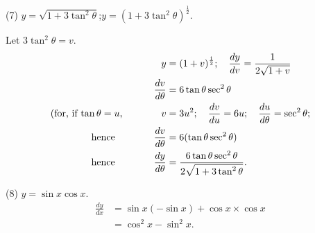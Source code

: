\documentclass[12pt]{book}%
\begin{document}
(7) $y = \sqrt{1+3\tan^{2}\theta}$;\quad$y=(1+3 \tan^{2} \theta)^{\frac{1}{2}%
}$.

Let $3\tan^{2}\theta=v$.
\begin{align*}
y  &  = (1+v)^{\frac{1}{2}};\quad\frac{dy}{dv} = \frac{1}{2\sqrt{1+v}}\\
\frac{dv}{d\theta}  &  = 6\tan\theta\sec^{2} \theta\\
\text{(for, if $\tan\theta= u$,\qquad\qquad} v  &  = 3u^{2};\quad\frac{dv}{du}
= 6u;\quad\frac{du}{d\theta} = \sec^{2} \theta;\\
\text{hence\qquad\qquad} \frac{dv}{d\theta}  &  = 6 (\tan\theta\sec^{2}
\theta)\\
\text{hence\qquad\qquad} \frac{dy}{d\theta}  &  = \frac{6\tan\theta\sec
^{2}\theta}{2\sqrt{1 + 3\tan^{2}\theta}}.
\end{align*}


(8) $y=\sin x \cos x$.
\begin{align*}
\frac{dy}{dx}  &  = \sin x(-\sin x) + \cos x \times\cos x\\
&  = \cos^{2} x - \sin^{2} x.
\end{align*}
\end{document}
